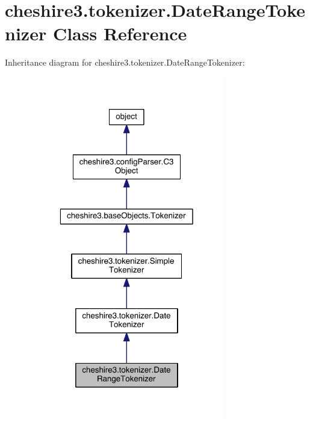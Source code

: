 \hypertarget{classcheshire3_1_1tokenizer_1_1_date_range_tokenizer}{\section{cheshire3.\-tokenizer.\-Date\-Range\-Tokenizer Class Reference}
\label{classcheshire3_1_1tokenizer_1_1_date_range_tokenizer}
}


Inheritance diagram for cheshire3.\-tokenizer.\-Date\-Range\-Tokenizer\-:
\nopagebreak
\begin{figure}[H]
\begin{center}
\leavevmode
\includegraphics[width=244pt]{classcheshire3_1_1tokenizer_1_1_date_range_tokenizer__inherit__graph}
\end{center}
\end{figure}


